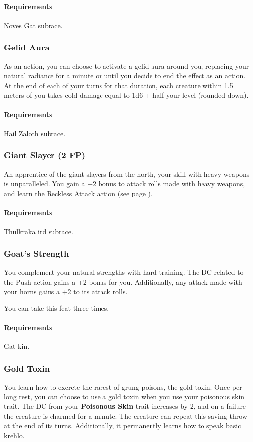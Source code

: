     \paragraph{Requirements} Noves Gat subrace.
\subsubsection{Gelid Aura} \label{feat::gelidaura}
    As an action, you can choose to activate a gelid aura around you, replacing your natural radiance for a minute or until you decide to end the effect as an action.
    At the end of each of your turns for that duration, each creature within 1.5 meters of you takes cold damage equal to 1d6 + half your level (rounded down).
    \paragraph{Requirements} Hail Zaloth subrace.
\subsubsection{Giant Slayer (2 FP)} \label{feat::giantslayer}
    An apprentice of the giant slayers from the north, your skill with heavy weapons is unparalleled.
    You gain a +2 bonus to attack rolls made with heavy weapons, and learn the Reckless Attack action (see page \pageref{act::recklessattack}).
    \paragraph{Requirements} Thulkraka ird subrace.
\subsubsection{Goat's Strength} \label{feat::goatsstrength}
    You complement your natural strengths with hard training.
    The DC related to the Push action gains a +2 bonus for you.
    Additionally, any attack made with your horns gains a +2 to its attack rolls.

    You can take this feat three times.
    \paragraph{Requirements} Gat kin.
\subsubsection{Gold Toxin} \label{feat::goldtoxin}
    You learn how to excrete the rarest of grung poisons, the gold toxin.
    Once per long rest, you can choose to use a gold toxin when you use your poisonous skin trait.
    The DC from your \textbf{Poisonous Skin} trait increases by 2, and on a failure the creature is charmed for a minute.
    The creature can repeat this saving throw at the end of its turns.
    Additionally, it permanently learns how to speak basic krehlo.
